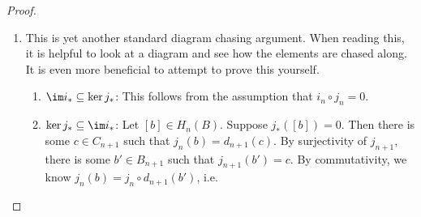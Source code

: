 \documentclass[a4paper]{article}
\begin{document}
\begin{proof}
\begin{enumerate}
\begin{enumerate}
\begin{align*}
            &= i_{n - 1} \circ d_n (a) + d_n(y).
          \end{align*}
          Hence when we pull back $d_n(y')$ and $d_n(y)$ to $A_{n - 1}$, the results differ by the boundary $d_n(a)$, and hence produce the same homology class.
        \item Suppose $[x'] = [x]$. We want to show that $\partial_* [x] = \partial_*[x']$. This time, we add a layer above.
          \[
            \begin{tikzcd}
              0 \ar[r] & A_{n + 1} \ar[r, "i_{n + 1}"] \ar[d, "d_{n + 1}"] & B_{n + 1} \ar[r, "j_{n + 1}"] \ar[d, "d_{n + 1}"] & C_{n + 1} \ar[r] \ar[d, "d_{n + 1}"] & 0\\
              0 \ar[r] & A_n \ar[r, "i_n"] \ar[d, "d_n"] & B_n \ar[r, "j_n"] \ar[d, "d_n"] & C_n \ar[r] \ar[d, "d_n"] & 0\\
              0 \ar[r] & A_{n - 1} \ar[r, "i_{n - 1}"] & B_{n - 1} \ar[r, "j_{n - 1}"] & C_{n - 1} \ar[r] & 0
            \end{tikzcd}
          \]
          By definition, since $[x'] = [x]$, there is some $c \in C_{n + 1}$ such that
          \[
            x' = x + d_{n + 1} (c).
          \]
          By surjectivity of $j_{n + 1}$, we can write $c = j_{n + 1}(b)$ for some $b \in B_{n + 1}$. By commutativity of the squares, we know
          \[
            x' = x + j_n \circ d_{n + 1} (b).
          \]
          The next step of the proof is to find some $y$ such that $j_n (y) = x$. Then
          \[
            j_n(y + d_{n + 1} (b)) = x'.
          \]
          So the corresponding $y'$ is $y' = y + d_{n + 1}(b)$. So $d_n (y) = d_n(y')$, and hence $\partial_*[x] = \partial_* [x']$.
      \end{enumerate}
    \item This is yet another standard diagram chasing argument. When reading this, it is helpful to look at a diagram and see how the elements are chased along. It is even more beneficial to attempt to prove this yourself.
      \begin{enumerate}
        \item $\im i_* \subseteq \ker j_*$: This follows from the assumption that $i_n \circ j_n = 0$.
        \item $\ker j_* \subseteq \im i_*$: Let $[b] \in H_n(B)$. Suppose $j_*([b]) = 0$. Then there is some $c \in C_{n + 1}$ such that $j_n(b) = d_{n + 1}(c)$. By surjectivity of $j_{n + 1}$, there is some $b' \in B_{n + 1}$ such that $j_{n + 1}(b') = c$. By commutativity, we know $j_n(b) = j_n \circ d_{n + 1}(b')$, i.e.

\end{enumerate}
\end{enumerate}
\end{proof}
\end{document}
